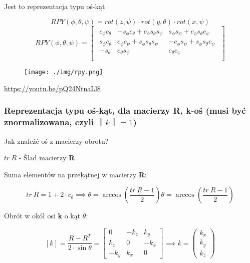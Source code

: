 \documentclass{article}
\newcommand{\norm}[1]{\left\lVert#1\right\rVert}
\begin{document}
Jest to reprezentacja typu oś-kąt

\Large
$$
    RPY\left(\phi, \theta, \psi\right)=rot(z, \psi) \cdot rot(y, \theta) \cdot rot(x, \psi)
$$
$$
    RPY( \phi, \theta, \psi ) = \begin{bmatrix} \begin{array}{rrr}
        c_{\phi} c_{\theta}   & -s_{\phi} c_{\theta} + c_{\phi} s_{\theta} s_{\psi} & s_{\phi} s_{\psi} + c_{\phi} s_{\theta} c_{\psi}  \\
        s_{\phi} c_{\theta}   & c_{\phi} c_{\psi} + s_{\phi} s_{\theta} s_{\psi}    & -c_{\phi} s_{\psi} + s_{\phi} s_{\theta} c_{\psi}  \\
        -s_{\theta}           & c_{\theta} s_{\psi}                                 & c_{\theta} c_{\psi}  \\
    \end{array} \end{bmatrix}
$$
\normalsize


\begin{figure}[h!]
    \centering
    \texttt{[image: ./img/rpy.png]}
\end{figure}
\url{https://youtu.be/pQ24NtnaLl8}

\subsubsection{Reprezentacja typu oś-kąt, dla macierzy {\bf R}, k-oś (musi być znormalizowana, czyli $\norm{k}=1$)}

Jak znaleźć oś z macierzy obrotu?

$tr \ R$ - Ślad macierzy {\bf R}

Suma elementów na przekątnej w macierzy {\bf R}:

\Large
$$
    tr \ R=1+2\cdot c_{\theta} \implies \theta=\arccos\left(\frac{tr \ R-1}{2}\right)
    \theta = \arccos\left(\frac{tr \ R - 1}{2}\right)
$$
\normalsize

Obrót w okół osi {\bf k} o kąt $\theta$:

\Large
$$
    \left[k\right]=\frac{R-R^{T}}{2\cdot\sin\theta}=
    \begin{bmatrix}
        0      & -k_{z} & k_{y}  \\[0.3em]
        k_{z}  & 0      & -k_{x} \\[0.3em]
        -k_{y} & k_{x}  & 0
    \end{bmatrix}
    \implies
    k =
    \begin{pmatrix}
        k_{x} \\
        k_{y} \\
        k_{z}
    \end{pmatrix}
$$
\normalsize
\end{document}
